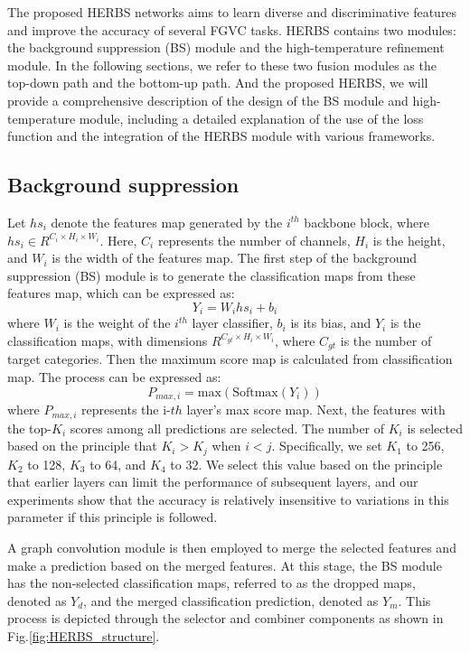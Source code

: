 \documentclass[journal]{IEEEtran}
\begin{document}
The proposed HERBS networks aims to learn diverse and discriminative features and improve the accuracy of several FGVC tasks. HERBS contains two modules: the background suppression (BS) module and the high-temperature refinement module. In the following sections, we refer to these two fusion modules as the top-down path and the bottom-up path. And the proposed HERBS, we will provide a comprehensive description of the design of the BS module and high-temperature module, including a detailed explanation of the use of the loss function and the integration of the HERBS module with various frameworks.

\subsection{Background suppression}

Let $hs_{i}$ denote the features map generated by the $i^{th}$ backbone block, where $hs_{i} \in R^{C_{i} \times H_{i} \times W_{i}}$. Here, $C_{i}$ represents the number of channels, $H_{i}$ is the height, and $W_{i}$ is the width of the features map. The first step of the background suppression (BS) module is to generate the classification maps from these features map, which can be expressed as:
\begin{equation} \label{eq:11}
Y_{i} = W_{i}hs_{i} + b_{i}
\end{equation}
where $W_{i}$ is the weight of the $i^{th}$ layer classifier, $b_{i}$ is its bias, and $Y_{i}$ is the classification maps, with dimensions $R^{C_{gt}\times H_{i}\times W_{i}}$, where $C_{gt}$ is the number of target categories. Then the maximum score map is calculated from classification map. The process can be expressed as:
\begin{equation} \label{eq:12}
P_{max, i} = \text{max}(\text{Softmax}(Y_{i}))
\end{equation}
where $P_{max, i}$ represents the i-$th$ layer's max score map. Next, the features with the top-$K_{i}$ scores among all predictions are selected. The number of $K_{i}$ is selected based on the principle that $K_{i} > K_{j}$ when $i < j$. Specifically, we set $K_{1}$ to 256, $K_{2}$ to 128, $K_{3}$ to 64, and $K_{4}$ to 32. We select this value based on the principle that earlier layers can limit the performance of subsequent layers, and our experiments show that the accuracy is relatively insensitive to variations in this parameter if this principle is followed.

A graph convolution module is then employed to merge the selected features and make a prediction based on the merged features. At this stage, the BS module has the non-selected classification maps, referred to as the dropped maps, denoted as $Y_{d}$, and the merged classification prediction, denoted as $Y_{m}$. This process is depicted through the selector and combiner components as shown in Fig.\ref{fig:HERBS_structure}. 
\end{document}

